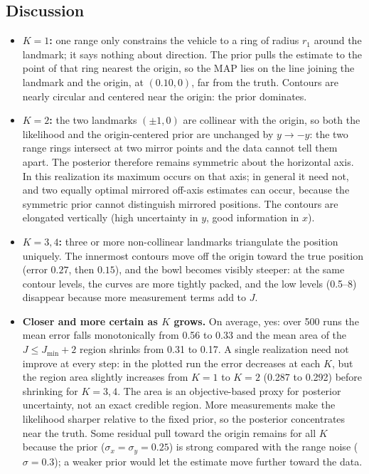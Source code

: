 \documentclass[11pt]{article}
\begin{document}
\subsection*{Discussion}
\begin{itemize}
\item \textbf{$K=1$:} one range only constrains the vehicle to a ring of radius $r_1$ around the landmark; it says nothing about direction. The prior pulls the estimate to the point of that ring nearest the origin, so the MAP lies on the line joining the landmark and the origin, at $(0.10,0)$, far from the truth. Contours are nearly circular and centered near the origin: the prior dominates.
\item \textbf{$K=2$:} the two landmarks $(\pm1,0)$ are collinear with the origin, so both the likelihood and the origin-centered prior are unchanged by $y\to-y$: the two range rings intersect at two mirror points and the data cannot tell them apart. The posterior therefore remains symmetric about the horizontal axis. In this realization its maximum occurs on that axis; in general it need not, and two equally optimal mirrored off-axis estimates can occur, because the symmetric prior cannot distinguish mirrored positions. The contours are elongated vertically (high uncertainty in $y$, good information in $x$).
\item \textbf{$K=3,4$:} three or more non-collinear landmarks triangulate the position uniquely. The innermost contours move off the origin toward the true position (error $0.27$, then $0.15$), and the bowl becomes visibly steeper: at the same contour levels, the curves are more tightly packed, and the low levels (0.5--8) disappear because more measurement terms add to $J$.
\item \textbf{Closer and more certain as $K$ grows.} On average, yes: over 500 runs the mean error falls monotonically from 0.56 to 0.33 and the mean area of the $J\le J_{\min}+2$ region shrinks from 0.31 to 0.17. A single realization need not improve at every step: in the plotted run the error decreases at each $K$, but the region area slightly increases from $K=1$ to $K=2$ (0.287 to 0.292) before shrinking for $K=3,4$. The area is an objective-based proxy for posterior uncertainty, not an exact credible region. More measurements make the likelihood sharper relative to the fixed prior, so the posterior concentrates near the truth. Some residual pull toward the origin remains for all $K$ because the prior ($\sigma_x=\sigma_y=0.25$) is strong compared with the range noise ($\sigma=0.3$); a weaker prior would let the estimate move further toward the data.
\end{itemize}
\end{document}
